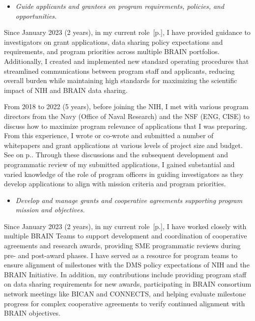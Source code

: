 \documentclass[10pt]{article}
\newcommand{\see}[1]{[\textcolor{hopkinsblue}{p.\pageref{sec:#1}}]}
\newcommand{\cf}[1]{\textcolor{hopkinsblue}{See \emph{\nameref{sec:#1}} on p.\pageref{sec:#1}}}
\begin{document}
\begin{itemize}
  \color{hopkinsblue}
  \item \emph{Guide applicants and grantees on program requirements, policies,
and opportunities.}
\end{itemize}

Since January 2023 (2 years), in my current role~\see{jobobd}, I have
provided guidance to investigators on grant applications, data sharing policy
expectations and requirements, and program priorities across multiple BRAIN
portfolios. Additionally, I created and implemented new standard operating
procedures that streamlined communications between program staff and applicants,
reducing overall burden while maintaining high standards for maximizing the
scientific impact of NIH and BRAIN data sharing.

From 2018 to 2022 (5 years), before joining the NIH, I met with various
program directors from the Navy (Office of Naval Research) and the NSF (ENG,
CISE) to discuss how to maximize program relevance of applications that I was
preparing. From this experience, I wrote or co-wrote and submitted a number of
whitepapers and grant applications at various levels of project size and budget.
\cf{res}. Through these discussions and the subsequent development and
programmatic review of my submitted applications, I gained substantial and
varied knowledge of the role of program officers in guiding investigators as
they develop applications to align with mission criteria and program priorities.


\begin{itemize}
  \color{hopkinsblue}
  \item \emph{Develop and manage grants and cooperative agreements supporting
program mission and objectives.}
\end{itemize}

Since January 2023 (2 years), in my current role~\see{jobobd}, I have worked
closely with multiple BRAIN Teams to support development and coordination of
cooperative agreements and research awards, providing SME programmatic reviews
during pre- and post-award phases. I have served as a resource for program
teams to ensure alignment of milestones with the DMS policy expectations of
NIH and the BRAIN Initiative. In addition, my contributions include providing
program staff on data sharing requirements for new awards, participating in
BRAIN consortium network meetings like BICAN and CONNECTS, and helping evaluate
milestone progress for complex cooperative agreements to verify continued
alignment with BRAIN objectives.
\end{document}

